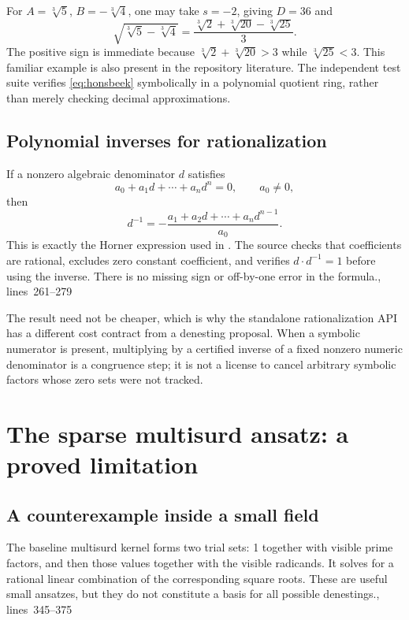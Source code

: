 \documentclass[11pt,a4paper]{article}
\newcommand{\code}[1]{\texttt{\detokenize{#1}}}
\newcommand{\src}[1]{\cite{source}, lines~#1}
\theoremstyle{definition}\newtheorem{definition}[proposition]{Definition}
\theoremstyle{remark}\newtheorem{remark}[proposition]{Remark}
\begin{document}
For $A=\sqrt[3]5$, $B=-\sqrt[3]4$, one may take $s=-2$, giving $D=36$ and
\begin{equation}
 \sqrt{\sqrt[3]5-\sqrt[3]4}
 =\frac{\sqrt[3]2+\sqrt[3]{20}-\sqrt[3]{25}}3.
\end{equation}
The positive sign is immediate because $\sqrt[3]2+\sqrt[3]{20}>3$ while
$\sqrt[3]{25}<3$. This familiar example is also present in the repository
literature.\cite{jeffrey,landau} The independent test suite verifies
\eqref{eq:honsbeek} symbolically in a polynomial quotient ring, rather than
merely checking decimal approximations.

\subsection{Polynomial inverses for rationalization}
If a nonzero algebraic denominator $d$ satisfies
\begin{equation}
 a_0+a_1d+\cdots+a_nd^n=0,\qquad a_0\ne0,
\end{equation}
then
\begin{equation}
 d^{-1}=-\frac{a_1+a_2d+\cdots+a_nd^{n-1}}{a_0}.
\end{equation}
This is exactly the Horner expression used in \code{rationalizeRaw}. The source
checks that coefficients are rational, excludes zero constant coefficient,
and verifies $d\cdot d^{-1}=1$ before using the inverse. There is no missing sign
or off-by-one error in the formula.\src{261--279}

The result need not be cheaper, which is why the standalone rationalization
API has a different cost contract from a denesting proposal. When a symbolic
numerator is present, multiplying by a certified inverse of a fixed nonzero
numeric denominator is a congruence step; it is not a license to cancel arbitrary
symbolic factors whose zero sets were not tracked.

\section{The sparse multisurd ansatz: a proved limitation}

\subsection{A counterexample inside a small field}
The baseline multisurd kernel forms two trial sets: 1 together with visible
prime factors, and then those values together with the visible radicands. It
solves for a rational linear combination of the corresponding square roots.
These are useful small ansatzes, but they do not constitute a basis for all
possible denestings.\src{345--375}
\end{document}
